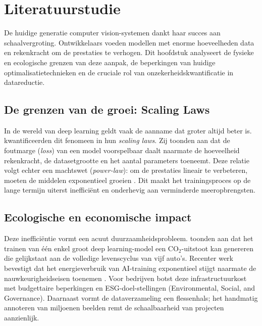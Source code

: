 \section{Literatuurstudie}%
\label{sec:literatuurstudie}

De huidige generatie computer vision-systemen dankt haar succes aan schaalvergroting. Ontwikkelaars voeden modellen met enorme hoeveelheden data en rekenkracht om de prestaties te verhogen. Dit hoofdstuk analyseert de fysieke en ecologische grenzen van deze aanpak, de beperkingen van huidige optimalisatietechnieken en de cruciale rol van onzekerheidskwantificatie in datareductie.\\

\subsection{De grenzen van de groei: Scaling Laws} 
In de wereld van deep learning geldt vaak de aanname dat groter altijd beter is. \textcite{kaplan2020scaling} kwantificeerden dit fenomeen in hun \textit{scaling laws}. Zij toonden aan dat de foutmarge (\textit{loss}) van een model voorspelbaar daalt naarmate de hoeveelheid rekenkracht, de datasetgrootte en het aantal parameters toeneemt. Deze relatie volgt echter een machtswet (\textit{power-law}): om de prestaties lineair te verbeteren, moeten de middelen exponentieel groeien \autocite{kaplan2020scaling}. Dit maakt het trainingsproces op de lange termijn uiterst inefficiënt en onderhevig aan verminderde meeropbrengsten.\\

\subsection{Ecologische en economische impact} 
Deze inefficiëntie vormt een acuut duurzaamheidsprobleem. \textcite{strubell2019energy} toonden aan dat het trainen van één enkel groot deep learning-model een CO$_2$-uitstoot kan genereren die gelijkstaat aan de volledige levenscyclus van vijf auto’s. Recenter werk bevestigt dat het energieverbruik van AI-training exponentieel stijgt naarmate de nauwkeurigheidseisen toenemen \autocite{patterson2021carbon}. Voor bedrijven botst deze infrastructuurkost met budgettaire beperkingen en ESG-doel-\newline stellingen (Environmental, Social, and Governance). Daarnaast vormt de dataverzameling een flessenhals; het handmatig annoteren van miljoenen beelden remt de schaalbaarheid van projecten aanzienlijk.\\

